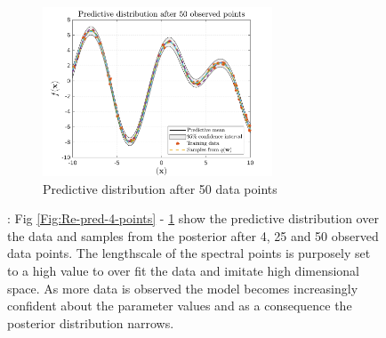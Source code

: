 \begin{figure}[htp!]
  \begin{subfigure}[b]{0.95\linewidth}
    \centering
    \includegraphics[trim={0 0.1cm 0 0.70cm},clip,height=0.27\textheight,width=0.75\textwidth]{Chapter3/Figures/func_uncertainty_3.png} 
    \caption{Predictive distribution after 50 data points} 
    \label{Fig:Re-pred-50-points}
  \end{subfigure}
 
\caption[Reduction in epistemic uncertainty with added data]{: Fig \ref{Fig:Re-pred-4-points} - \ref{Fig:Re-pred-50-points} show the predictive distribution over the data and samples from the posterior after 4, 25 and 50 observed data points. The lengthscale of the spectral points is purposely set to a high value to over fit the data and imitate high dimensional space. As more data is observed the model becomes increasingly confident about the parameter values and as a consequence the posterior distribution narrows.}
\label{Fig:Re-predictive-fit-to-varying-number-of-datapoints} 
\end{figure}

